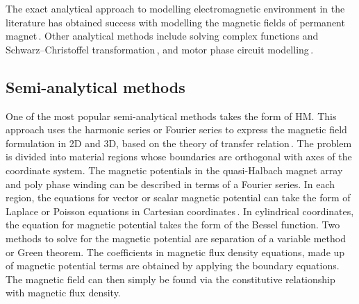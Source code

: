         
        The exact analytical approach to modelling electromagnetic environment in the literature has obtained success with modelling the magnetic fields of permanent magnet\,\cite{Ravaud2010MagneticMagnet}. Other analytical methods include solving complex functions and Schwarz–Christoffel transformation\,\cite{Zarko2006AnalyticalPermeance}, and motor phase circuit modelling\,\cite{Proca2003AnalyticalMagnets}.
        
        
    \subsection{Semi-analytical methods}            \label{Chapter:background/modelling techniques for designing motors/semi-analytical methods}
    
    
        One of the most popular semi-analytical methods takes the form of \ac{HM}. This approach uses the harmonic series or Fourier series to express the magnetic field formulation in 2D and 3D, based on the theory of transfer relation\,\cite{Melcher1981ContinuumElectromechanics}. The problem is divided into material regions whose boundaries are orthogonal with axes of the coordinate system. The magnetic potentials in the quasi-Halbach magnet array and poly phase winding can be described in terms of a Fourier series. In each region, the equations for vector or scalar magnetic potential can take the form of Laplace or Poisson equations in Cartesian coordinates\,\cite{Trumper1993,Wang1999}. In cylindrical coordinates, the equation for magnetic potential takes the form of the Bessel function\cite{Gysen2008AnalyticalFramework,Ruddy2011a,Gysen20113-DMagnets}. Two methods to solve for the magnetic potential are separation of a variable method or Green theorem. The coefficients in magnetic flux density equations, made up of magnetic potential terms are obtained by applying the boundary equations. The magnetic field can then simply be found via the constitutive relationship with magnetic flux density.
        
